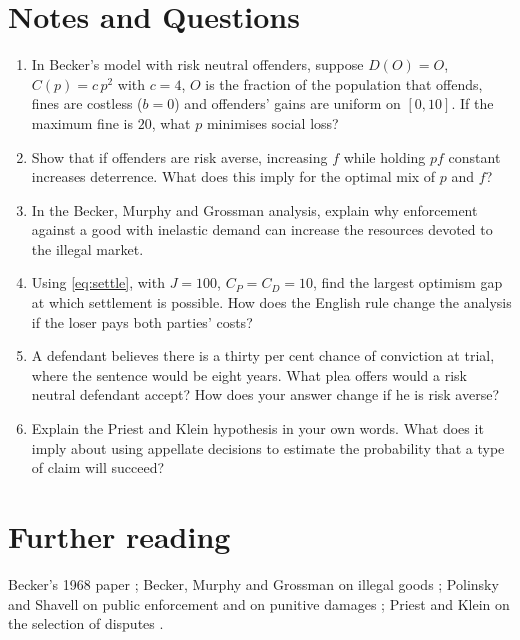 \section*{Notes and Questions}
\begin{enumerate}[label=\arabic*.]
\item In Becker's model with risk neutral offenders, suppose $D(O) = O$, $C(p) = c\,p^2$ with $c = 4$, $O$ is the fraction of the population that offends, fines are costless ($b = 0$) and offenders' gains are uniform on $[0, 10]$. If the maximum fine is $20$, what $p$ minimises social loss?
\item Show that if offenders are risk averse, increasing $f$ while holding $pf$ constant increases deterrence. What does this imply for the optimal mix of $p$ and $f$?
\item In the Becker, Murphy and Grossman analysis, explain why enforcement against a good with inelastic demand can increase the resources devoted to the illegal market.
\item Using \eqref{eq:settle}, with $J = 100$, $C_P = C_D = 10$, find the largest optimism gap at which settlement is possible. How does the English rule change the analysis if the loser pays both parties' costs?
\item A defendant believes there is a thirty per cent chance of conviction at trial, where the sentence would be eight years. What plea offers would a risk neutral defendant accept? How does your answer change if he is risk averse?
\item Explain the Priest and Klein hypothesis in your own words. What does it imply about using appellate decisions to estimate the probability that a type of claim will succeed?
\end{enumerate}

\section*{Further reading}
Becker's 1968 paper \citep{becker1968}; Becker, Murphy and Grossman on illegal goods \citep{bmg2006}; Polinsky and Shavell on public enforcement and on punitive damages \citep{polinsky2000,polinsky1998}; Priest and Klein on the selection of disputes \citep{priest_klein1984}.

